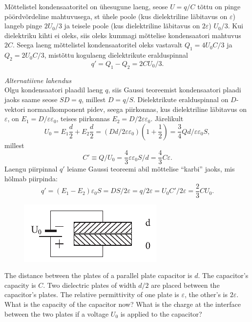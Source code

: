 {Mõttelistel kondensaatoritel on ühesugune laeng, seose $U=q/C$ tõttu on pinge pöördvõrdeline mahtuvusega, st ühele poole (kus dielektriline läbitavus on $\varepsilon$) langeb pinge $2U_0/3$ ja teisele poole (kus dielektriline läbitavus on $2\varepsilon$) $U_0/3$. Kui dielektriku kihti ei oleks, siis oleks kummagi mõttelise kondensaatori mahtuvus $2C$. Seega laeng mõttelistel kondensaatoritel oleks vastavalt $Q_1=4U_0C/3$ ja $Q_2=2U_0C/3$, mistõttu kogulaeng dielektrikute eralduspinnal
\[
q'=Q_1-Q_2=2CU_0/3.
\]
\vspace{0.5\baselineskip}

\emph{Alternatiivne lahendus}\\
Olgu kondensaatori plaadil laeng $q$, siis Gaussi teoreemist kondensaatori plaadi jaoks saame seose $SD=q$, millest $D=q/S$. Dielektrikute eralduspinnal on $D$-vektori normaalkomponent pidev, seega piirkonnas, kus dielektriline läbitavus on $\varepsilon$, on $E_1=D/\varepsilon\varepsilon_0$, teises piirkonnas $E_2=D/2\varepsilon\varepsilon_0$. Järelikult
\[
U_0=E_1\frac d2+E_2\frac d2=(Dd/2\varepsilon\varepsilon_0)(1+\frac 12)=\frac 34Qd/\varepsilon\varepsilon_0S,
\]
millest
\[
C'\equiv Q/U_0=\frac 43\varepsilon\varepsilon_0S/d=\frac 43C\varepsilon.
\]
Laengu piirpinnal $q'$ leiame Gaussi teoreemi abil mõttelise \enquote{karbi} jaoks, mis hõlmab piirpinda: 
\[
q'=(E_1-E_2)\varepsilon_0S=DS/2\varepsilon=q/2\varepsilon=U_0C'/2\varepsilon=\frac 23CU_0.
\]
\fi


\ifEngStatement
\begin{figure}
	\vspace{-13pt}
	\includegraphics[width=\linewidth]{2017-lahg-07-res-cap2}
\end{figure}
The distance between the plates of a parallel plate capacitor is $d$. The capacitor’s capacity is $C$. Two dielectric plates of width $d/2$ are placed between the capacitor’s plates. The relative permittivity of one plate is $\varepsilon$, the other’s is $2\varepsilon$. What is the capacity of the capacitor now? What is the charge at the interface between the two plates if a voltage $U_0$ is applied to the capacitor?
\fi


}
